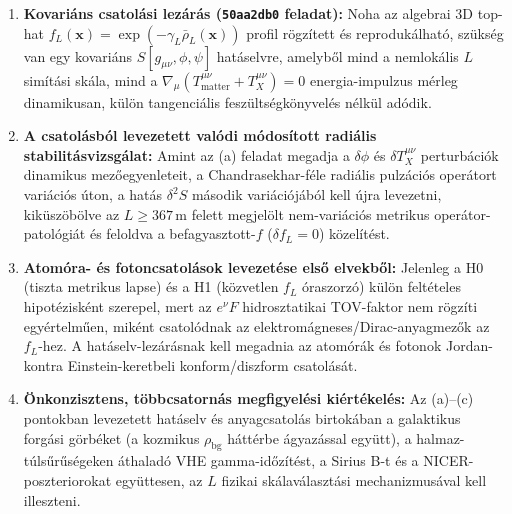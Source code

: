 \begin{enumerate}\setlength{\itemsep}{1.5pt}\setlength{\parskip}{0pt}\setlength{\topsep}{1pt}
  \item[\textbf{(a)}] \textbf{Kovari\'ans csatol\'asi lez\'ar\'as (\texttt{50aa2db0} feladat):} Noha az algebrai 3D top-hat $f_L(\mathbf{x}) = \exp(-\gamma_L\bar{\rho}_L(\mathbf{x}))$ profil r\"ogz\'itett \'es reproduk\'alhat\'o, sz\"uks\'eg van egy kovari\'ans $S[g_{\mu\nu},\phi,\psi]$ hat\'aselvre, amelyb\H{o}l mind a nemlok\'alis $L$ sim\'it\'asi sk\'ala, mind a $\nabla_\mu(T^{\mu\nu}_{\text{matter}} + T^{\mu\nu}_X) = 0$ energia-impulzus m\'erleg dinamikusan, k\"ul\"on tangenci\'alis fesz\"ults\'egk\"onyvel\'es n\'elk\"ul ad\'odik.
  \item[\textbf{(b)}] \textbf{A csatol\'asb\'ol levezetett val\'odi m\'odos\'itott radi\'alis stabilit\'asvizsg\'alat:} Amint az (a) feladat megadja a $\delta\phi$ \'es $\delta T^{\mu\nu}_X$ perturb\'aci\'ok dinamikus mez\H{o}egyenleteit, a Chandrasekhar-f\'ele radi\'alis pulz\'aci\'os oper\'atort vari\'aci\'os \'uton, a hat\'as $\delta^2 S$ m\'asodik vari\'aci\'oj\'ab\'ol kell \'ujra levezetni, kik\"usz\"ob\"olve az $L \ge 367\,\text{m}$ felett megjel\"olt nem-vari\'aci\'os metrikus oper\'ator-patol\'ogi\'at \'es feloldva a befagyasztott-$f$ ($\delta f_L = 0$) k\"ozel\'it\'est.
  \item[\textbf{(c)}] \textbf{Atom\'ora- \'es fotoncsatol\'asok levezet\'ese els\H{o} elvekb\H{o}l:} Jelenleg a H0 (tiszta metrikus lapse) \'es a H1 (k\"ozvetlen $f_L$ \'oraszorz\'o) k\"ul\"on felt\'eteles hipot\'ezisk\'ent szerepel, mert az $e^\nu F$ hidrosztatikai TOV-faktor nem r\"ogz\'iti egy\'ertelm\H{u}en, mik\'ent csatol\'odnak az elektrom\'agneses/Dirac-anyagmez\H{o}k az $f_L$-hez. A hat\'aselv-lez\'ar\'asnak kell megadnia az atom\'or\'ak \'es fotonok Jordan- kontra Einstein-keretbeli konform/diszform csatol\'as\'at.
  \item[\textbf{(d)}] \textbf{\"Onkonzisztens, t\"obbcsatorn\'as megfigyel\'esi ki\'ert\'ekel\'es:} Az (a)--(c) pontokban levezetett hat\'aselv \'es anyagcsatol\'as birtok\'aban a galaktikus forg\'asi g\"orb\'eket (a kozmikus $\rho_{\text{bg}}$ h\'att\'erbe \'agyaz\'assal egy\"utt), a halmaz-t\'uls\H{u}r\H{u}s\'egeken \'athalad\'o VHE gamma-id\H{o}z\'it\'est, a Sirius B-t \'es a NICER-poszteriorokat egy\"uttesen, az $L$ fizikai sk\'alav\'alaszt\'asi mechanizmus\'aval kell illeszteni.
\end{enumerate}


